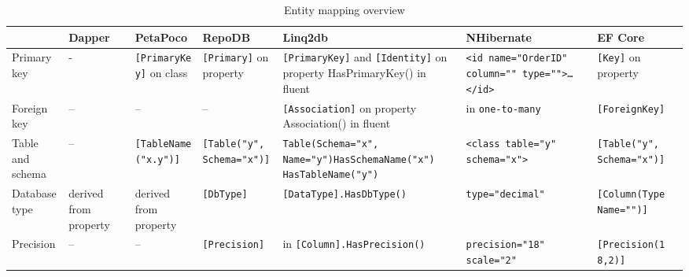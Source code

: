 \clearpage
\begin{landscape}
\begin{table}
\centering
\caption{Entity mapping overview}
\label{tab:entity_mapping}
\scriptsize
\def\arraystretch{1.35}
\begin{tabular}{
>{\raggedright\arraybackslash}p{20.00mm}
>{\arraybackslash}p{30.00mm}
>{\arraybackslash}p{30.00mm}
>{\arraybackslash}p{30.00mm}
>{\arraybackslash}p{30.00mm}
>{\arraybackslash}p{30.00mm}
>{\arraybackslash}p{40.00mm}
>{\arraybackslash}p{40.00mm}
}
\toprule
  &    \textbf{Dapper} &  \textbf{PetaPoco} &    \textbf{RepoDB} &   \textbf{Linq2db} & \textbf{NHibernate}  &    \textbf{EF Core} \\
\midrule
Primary key  & - & \texttt{[PrimaryKey]} on class & \texttt{[Primary]} on property & \texttt{[PrimaryKey]} and \texttt{[Identity]} on property \newline HasPrimaryKey() in fluent & \texttt{<id name="OrderID" column="" type="">\ldots</id>} & \texttt{[Key]} on property \\

\midrule
Foreign key & – & – & – & \texttt{[Association]} on property \newline Association() in fluent  & in \texttt{one-to-many} & \texttt{[ForeignKey]} \\

\midrule
Table and schema &
– &
\texttt{[TableName("x.y")]} &
\texttt{[Table("y", Schema="x")]} &
\texttt{Table(Schema="x", Name="y")}\newline\newline \texttt{HasSchemaName("x")} \newline \texttt{HasTableName("y")} &
\texttt{<class table="y" schema="x">} &
\texttt{[Table("y", Schema="x")]} \\

\midrule
Database type & derived from property & derived from property & \texttt{[DbType]} & \texttt{[DataType]}\newline\newline\texttt{.HasDbType()} & \texttt{type="decimal"} & \texttt{[Column(TypeName="")]} \\

\midrule
Precision & – & – & \texttt{[Precision]} & in \texttt{[Column]}\newline\newline\texttt{.HasPrecision()} & \texttt{precision="18" scale="2"} & \texttt{[Precision(18,2)]} \\


\end{tabular}
\end{table}
\end{landscape}
